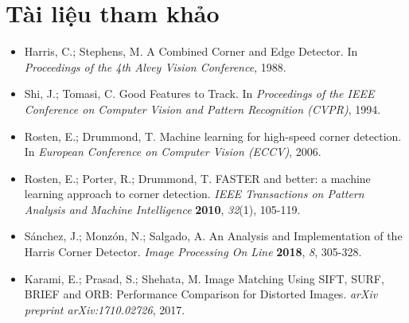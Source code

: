 \section*{Tài liệu tham khảo}
\begin{itemize}
    \item[1] Harris, C.; Stephens, M. A Combined Corner and Edge Detector. In \textit{Proceedings of the 4th Alvey Vision Conference}, 1988.
    \item[2] Shi, J.; Tomasi, C. Good Features to Track. In \textit{Proceedings of the IEEE Conference on Computer Vision and Pattern Recognition (CVPR)}, 1994.
    \item[3] Rosten, E.; Drummond, T. Machine learning for high-speed corner detection. In \textit{European Conference on Computer Vision (ECCV)}, 2006.
    \item[4] Rosten, E.; Porter, R.; Drummond, T. FASTER and better: a machine learning approach to corner detection. \textit{IEEE Transactions on Pattern Analysis and Machine Intelligence} \textbf{2010}, \textit{32}(1), 105-119.
    \item[5] Sánchez, J.; Monzón, N.; Salgado, A. An Analysis and Implementation of the Harris Corner Detector. \textit{Image Processing On Line} \textbf{2018}, \textit{8}, 305-328.
    \item[6] Karami, E.; Prasad, S.; Shehata, M. Image Matching Using SIFT, SURF, BRIEF and ORB: Performance Comparison for Distorted Images. \textit{arXiv preprint arXiv:1710.02726}, 2017.
\end{itemize}
